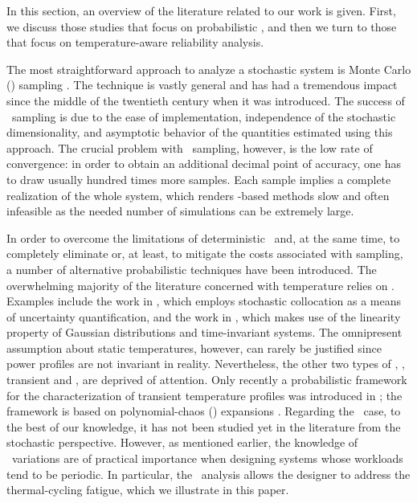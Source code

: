 In this section, an overview of the literature related to our work is given.
First, we discuss those studies that focus on probabilistic \ta, and then we turn to those that focus on temperature-aware reliability analysis.

The most straightforward approach to analyze a stochastic system is Monte Carlo (\MC) sampling \cite{maitre2010}.
The technique is vastly general and has had a tremendous impact since the middle of the twentieth century when it was introduced.
The success of \MC\ sampling is due to the ease of implementation, independence of the stochastic dimensionality, and asymptotic behavior of the quantities estimated using this approach.
The crucial problem with \MC\ sampling, however, is the low rate of convergence: in order to obtain an additional decimal point of accuracy, one has to draw usually hundred times more samples.
Each sample implies a complete realization of the whole system, which renders \MC-based methods slow and often infeasible as the needed number of simulations can be extremely large.

In order to overcome the limitations of deterministic \ta\ and, at the same time, to completely eliminate or, at least, to mitigate the costs associated with  sampling, a number of alternative probabilistic techniques have been introduced.
The overwhelming majority of the literature concerned with temperature relies on \sssta.
Examples include the work in \cite{lee2013}, which employs stochastic collocation \cite{maitre2010} as a means of uncertainty quantification, and the work in \cite{juan2012}, which makes use of the linearity property of Gaussian distributions and time-invariant systems.
The omnipresent assumption about static temperatures, however, can rarely be justified since power profiles are not invariant in reality.
Nevertheless, the other two types of \ta, \ie, transient and \DSS, are deprived of attention.
Only recently a probabilistic framework for the characterization of transient temperature profiles was introduced in \cite{ukhov2014}; the framework is based on polynomial-chaos (\PC) expansions \cite{maitre2010}.
Regarding the \DSS\ case, to the best of our knowledge, it has not been studied yet in the literature from the stochastic perspective.
However, as mentioned earlier, the knowledge of \DSS\ variations are of practical importance when designing systems whose workloads tend to be periodic.
In particular, the \DSS\ analysis allows the designer to address the thermal-cycling fatigue, which we illustrate in this paper.

